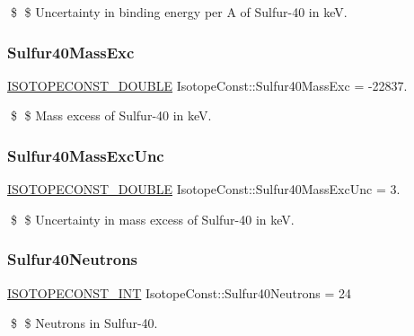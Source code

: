 \$ \$ Uncertainty in binding energy per A of Sulfur-\/40 in keV. \mbox{\label{group___isotope_const-_sulfur-_s40_gad149c99aa3d0e7dbf1d3bce3eb3bffc8}} 
\subsubsection{\texorpdfstring{Sulfur40\+Mass\+Exc}{Sulfur40MassExc}}
{\footnotesize\ttfamily \mbox{\hyperlink{group___isotope_const-_macros_ga8f45a7272ce02c0b4c65c44636ed719a}{I\+S\+O\+T\+O\+P\+E\+C\+O\+N\+S\+T\+\_\+\+D\+O\+U\+B\+LE}} Isotope\+Const\+::\+Sulfur40\+Mass\+Exc = -\/22837.}

\$ \$ Mass excess of Sulfur-\/40 in keV. \mbox{\label{group___isotope_const-_sulfur-_s40_gaa2ef5df6d32d94eea4dabed55a312660}} 
\subsubsection{\texorpdfstring{Sulfur40\+Mass\+Exc\+Unc}{Sulfur40MassExcUnc}}
{\footnotesize\ttfamily \mbox{\hyperlink{group___isotope_const-_macros_ga8f45a7272ce02c0b4c65c44636ed719a}{I\+S\+O\+T\+O\+P\+E\+C\+O\+N\+S\+T\+\_\+\+D\+O\+U\+B\+LE}} Isotope\+Const\+::\+Sulfur40\+Mass\+Exc\+Unc = 3.}

\$ \$ Uncertainty in mass excess of Sulfur-\/40 in keV. \mbox{\label{group___isotope_const-_sulfur-_s40_gac6ef37c08a58f64bb9c7995ba0bad8ac}} 
\subsubsection{\texorpdfstring{Sulfur40\+Neutrons}{Sulfur40Neutrons}}
{\footnotesize\ttfamily \mbox{\hyperlink{group___isotope_const-_macros_ga5f18360b3e99483a35c32d789e62621c}{I\+S\+O\+T\+O\+P\+E\+C\+O\+N\+S\+T\+\_\+\+I\+NT}} Isotope\+Const\+::\+Sulfur40\+Neutrons = 24}

\$ \$ Neutrons in Sulfur-\/40. \mbox{\label{group___isotope_const-_sulfur-_s40_ga7ce4b83782e814506cb11380a9b4ce4c}} 
